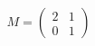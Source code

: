 \documentclass[preview]{standalone}
\begin{document}
\begin{align*}
M = \begin{pmatrix} 2 & 1 \\ 0 & 1 \end{pmatrix}
\end{align*}
\end{document}
